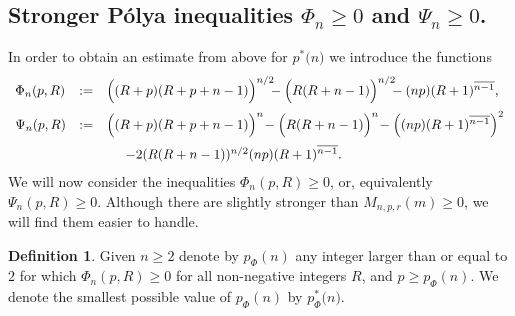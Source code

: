 \documentclass[11pt,a4paper,times]{amsart}
\theoremstyle{plain}
\theoremstyle{definition}
\newtheorem{definition}[thm]{Definition}%
\numberwithin{equation}{section}
\newcommand{\eqskip}{ \vspace*{2mm}\\ }
\newcommand{\pin}[1]{p^*{#1}}
\newcommand{\pnphi}{p_{\Phi}(n)}
\newcommand{\piphi}[1]{p^*_{\Phi}{#1}}
\newcommand{\txtg}{\textcolor{green}}
\begin{document}
{\subsection{Stronger P\'{o}lya inequalities $\Phi_n\geq 0$ and $\Psi_n\geq 0$.}
In order to obtain an estimate from above for  $\pin(n)$ we  introduce {the functions}
 \begin{gather}\label{PhiPsi}
 \begin{array}{lll}
\Phi_n(p,R) &:= & \Big{(}(R+p)(R+p+n-1)\Big{)}^{n/2}\!\!\!-
 \Big{(}R(R+n-1)\Big{)}^{n/2}\!\!\!- (np)(R+1)^{\overline{n-1}},
 \eqskip
\Psi_n(p,R) & := & \Big{(}(R+p)(R+p+n-1)\Big{)}^{n}\!-
 \Big{(}R(R+n-1)\Big{)}^{n}\!- \left((np)(R+1)^{\overline{n-1}}\right)^2\eqskip
 & & \hspace*{5mm}  -2(R(R+n-1))^{n/2}(np)(R+1)^{\overline{n-1}}.
 \end{array}
 \end{gather}
{ We will now consider the inequalities $\Phi_n(p,R)\geq 0$, or, equivalently $\Psi_n(p,R)\geq 0$. Although there are slightly stronger than
$M_{n,p,r}(m)\geq 0$, we will find them easier to handle.}
%
 \begin{definition} Given $n\geq 2$ denote by $\pnphi$ any integer larger than or equal to $2$ for which $\Phi_n(p,R)\geq 0$ for all
 non-negative integers $R$, and $p\geq \pnphi$. We denote the smallest possible value of $\pnphi$ by $\piphi(n)$.
 \end{definition} 
 
}
\end{document}
